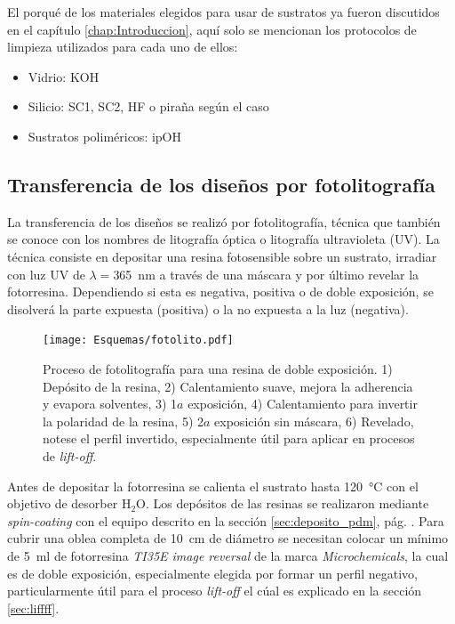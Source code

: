 			\pagebreak El porqué de los materiales elegidos para usar de sustratos ya fueron discutidos en el capítulo \ref{chap:Introduccion}, aquí solo se mencionan los protocolos de limpieza\cite{Franssila2004,Kern1990} utilizados para cada uno de ellos:

				\begin{itemize}
					\item{Vidrio: KOH}
					\item{Silicio: SC1, SC2, HF o piraña según el caso}
					\item{Sustratos poliméricos: ipOH}
				\end{itemize}

    \subsection{Transferencia de los diseños por fotolitografía}\label{sec:fotolito}

		La transferencia de los diseños se realizó por fotolitografía, técnica que también se conoce con los nombres de litografía óptica o litografía ultravioleta (UV). La técnica consiste en depositar una resina fotosensible sobre un sustrato, irradiar con luz UV de $\lambda\!=$\SI{365}{nm} a través de una máscara y por último revelar la fotorresina. Dependiendo si esta es negativa, positiva o de doble exposición, se disolverá la parte expuesta (positiva) o la no expuesta a la luz (negativa). \cite{Jaeger2001,Franssila2004,Mack2007,Mack2006}
				

			  \begin{figure}[b!]
			  \begin{center}
			  \texttt{[image: Esquemas/fotolito.pdf]}
			  \caption[Esquema fotolitografía]{Proceso de fotolitografía para una resina de doble exposición. 1) Depósito de la resina, 2) Calentamiento suave, mejora la adherencia y evapora solventes, 3) 1$a$ exposición, 4) Calentamiento para invertir la polaridad de la resina, 5) 2$a$ exposición sin máscara, 6) Revelado, notese el perfil invertido, especialmente útil para aplicar en procesos de\textit{ lift-off}.}
			  \label{esq:fotolito}
			  \end{center}
			  \end{figure}	

		Antes de depositar la fotorresina se calienta el sustrato hasta \SI{120}{\celsius} con el objetivo de desorber H$_2$O. Los depósitos de las resinas se realizaron mediante \textit{spin-coating} con el equipo descrito en la sección \ref{sec:deposito_pdm}, pág. \pageref{sec:deposito_pdm}. Para cubrir una oblea completa de \SI{10}{\cm} de diámetro se necesitan colocar un mínimo de \SI{5}{\ml} de fotorresina \textit{TI35E image reversal} de la marca \textit{Microchemicals}, la cual es de doble exposición, especialmente elegida por formar un perfil negativo, particularmente útil para el proceso \textit{lift-off} el cúal es explicado en la sección \ref{sec:liffff}.\cite{MicrochemicalsTeam2009} 
	
